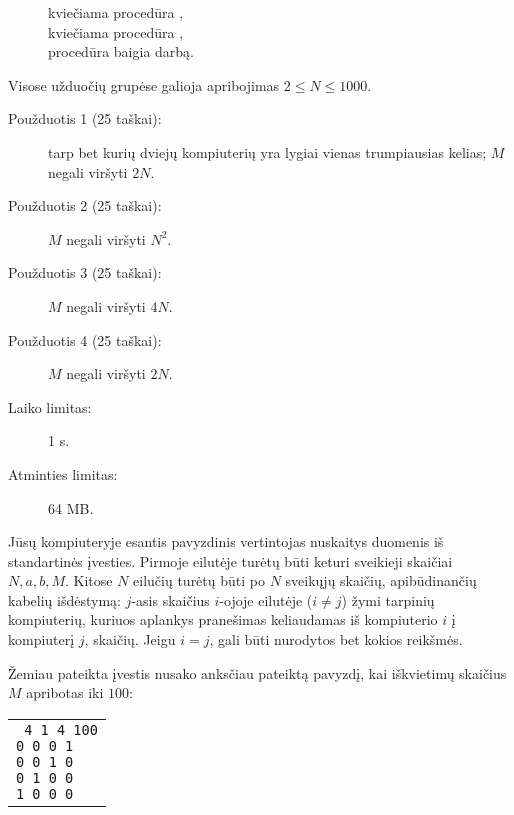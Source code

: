 \documentclass{boi2014-lt}
\begin{document}
    \begin{figure}[H]
        \centering
        kviečiama procedūra , \\
        kviečiama procedūra , \\
        procedūra  baigia darbą.
    \end{figure}

    \Scoring
    Visose užduočių grupėse galioja apribojimas $2 \le N \le 1000$.

    \begin{description}
        \item[Použduotis 1 (25 taškai):] tarp bet kurių dviejų kompiuterių yra
            lygiai vienas trumpiausias kelias; $M$ negali viršyti $2N$.
        \item[Použduotis 2 (25 taškai):] $M$ negali viršyti $N^2$.
        \item[Použduotis 3 (25 taškai):] $M$ negali viršyti $4N$.
        \item[Použduotis 4 (25 taškai):] $M$ negali viršyti $2N$.
    \end{description}

    \Constraints
    \begin{description}
        \item[Laiko limitas:] 1 s.
        \item[Atminties limitas:] 64 MB.
    \end{description}

    \Experimentation
    Jūsų kompiuteryje esantis pavyzdinis vertintojas nuskaitys duomenis iš
    standartinės įvesties. Pirmoje eilutėje turėtų būti keturi sveikieji
    skaičiai $N, a, b, M$. Kitose $N$ eilučių turėtų būti po $N$ sveikųjų
    skaičių, apibūdinančių kabelių išdėstymą:
    $j$-asis skaičius $i$-ojoje eilutėje ($i \neq j$) žymi tarpinių
    kompiuterių, kuriuos aplankys pranešimas keliaudamas iš kompiuterio $i$ į
    kompiuterį $j$, skaičių. Jeigu $i = j$, gali būti nurodytos bet kokios
    reikšmės.

    Žemiau pateikta įvestis nusako anksčiau pateiktą pavyzdį, kai iškvietimų
    skaičius $M$ apribotas iki $100$:

    \begin{center}
        \begin{tabular}{p{4cm}}
            {\tt
                4 1 4 100 \newline
                0 0 0 1 \newline
                0 0 1 0 \newline
                0 1 0 0 \newline
                1 0 0 0
            }
        \end{tabular}
    \end{center}
\end{document}
